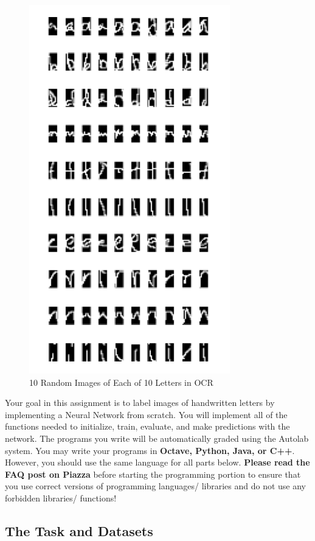 \documentclass[11pt]{exam}
\numberwithin{equation}{section} %
\numberwithin{figure}{section} %
\numberwithin{table}{section} %
\begin{document}
\begin{figure}[H]
    \centering
    \includegraphics[scale=0.99]{img/10lettergrid.png}
    \caption{10 Random Images of Each of 10 Letters in OCR}
    \label{fig:grid}
\end{figure}

Your goal in this assignment is to label images of handwritten letters by implementing a Neural Network from scratch. You will implement all of the functions needed to initialize, train, evaluate, and make predictions with the network. 
%
The programs you write will be automatically graded using the Autolab system. You may write your programs in \textbf{Octave, Python, Java, or C++}. However, you should use the same language for all parts below. \textbf{Please read the FAQ post on Piazza} before starting the programming portion to ensure that you use correct versions of programming languages/ libraries and do not use any forbidden libraries/ functions!

\subsection{The Task and Datasets}
\label{sec:dataset}
\end{document}
